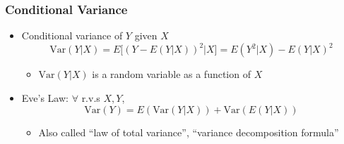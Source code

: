 \subsubsection*{Conditional Variance}
\begin{itemize}
    \item Conditional variance of $Y$ given $X$
    \begin{equation}
        \text{Var}(Y|X)=E\Bigr[(Y-E(Y|X))^2\Bigr|X\Bigr]=E\left(Y^2|X\right)-E(Y|X)^2
    \end{equation}
    \begin{itemize}
        \item $\text{Var}(Y|X)$ is a random variable as a function of $X$
    \end{itemize}
    \item Eve's Law: $\forall$ r.v.s $X,Y$,
    \begin{equation}
        \text{Var}(Y)=E(\text{Var}(Y|X))+\text{Var}(E(Y|X))
    \end{equation}
    \begin{itemize}
        \item Also called ``law of total variance'', ``variance decomposition formula''
    \end{itemize}
\end{itemize}
